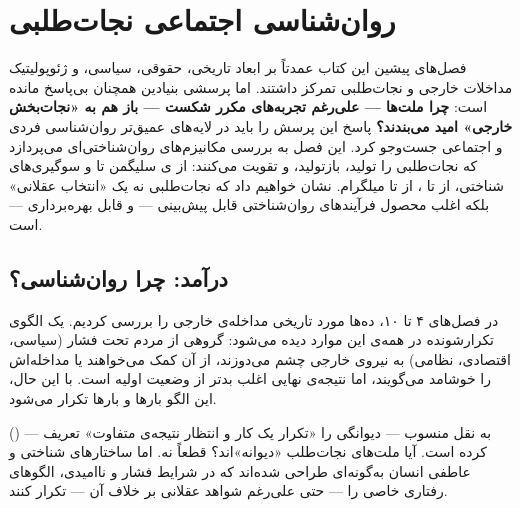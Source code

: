 \chapter{روان‌شناسی اجتماعی نجات‌طلبی}
\label{ch:social-psychology}

\begin{tcolorbox}[mybox, title={چکیده‌ی فصل}]
فصل‌های پیشین این کتاب عمدتاً بر ابعاد تاریخی، حقوقی، سیاسی، و ژئوپولیتیک مداخلات خارجی و نجات‌طلبی تمرکز داشتند. اما پرسشی بنیادین همچنان بی‌پاسخ مانده است: \textbf{چرا ملت‌ها — علی‌رغم تجربه‌های مکرر شکست — باز هم به «نجات‌بخش خارجی» امید می‌بندند؟} پاسخ این پرسش را باید در لایه‌های عمیق‌تر روان‌شناسی فردی و اجتماعی جست‌وجو کرد. این فصل به بررسی مکانیزم‌های روان‌شناختی‌ای می‌پردازد که نجات‌طلبی را تولید، بازتولید، و تقویت می‌کنند: از ی سلیگمن تا  و سوگیری‌های شناختی، از  تا ، از  تا  میلگرام. نشان خواهیم داد که نجات‌طلبی نه یک «انتخاب عقلانی» بلکه اغلب محصول فرآیندهای روان‌شناختی قابل پیش‌بینی — و قابل بهره‌برداری — است.
\end{tcolorbox}

\section{درآمد: چرا روان‌شناسی؟}
\label{sec:ch11-intro}

در فصل‌های ۴ تا ۱۰، ده‌ها مورد تاریخی مداخله‌ی خارجی را بررسی کردیم. یک الگوی تکرارشونده در همه‌ی این موارد دیده می‌شود: گروهی از مردم تحت فشار (سیاسی، اقتصادی، نظامی) به نیروی خارجی چشم می‌دوزند، از آن کمک می‌خواهند یا مداخله‌اش را خوشامد می‌گویند، اما نتیجه‌ی نهایی اغلب بدتر از وضعیت اولیه است. با این حال، این الگو بارها و بارها تکرار می‌شود.

 () — به نقل منسوب — دیوانگی را «تکرار یک کار و انتظار نتیجه‌ی متفاوت» تعریف کرده است. آیا ملت‌های نجات‌طلب «دیوانه»اند؟ قطعاً نه. اما ساختارهای شناختی و عاطفی انسان به‌گونه‌ای طراحی شده‌اند که در شرایط فشار و ناامیدی، الگوهای رفتاری خاصی را — حتی علی‌رغم شواهد عقلانی بر خلاف آن — تکرار کنند.

